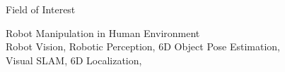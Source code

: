 \begin{rSection}{Field of Interest}
\item Robot Manipulation in Human Environment \\ Robot Vision, Robotic Perception, 6D Object Pose Estimation, \\ Visual \acf{SLAM}, 6D Localization,
\end{rSection}

